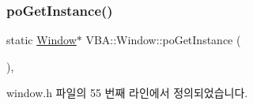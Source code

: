\mbox{\label{class_v_b_a_1_1_window_a8e084a0514c78b2c93013c3fb9e2e6e9}} 
\subsubsection{\texorpdfstring{po\+Get\+Instance()}{poGetInstance()}}
{\footnotesize\ttfamily static \mbox{\hyperlink{class_v_b_a_1_1_window}{Window}}$\ast$ V\+B\+A\+::\+Window\+::po\+Get\+Instance (\begin{DoxyParamCaption}{ }\end{DoxyParamCaption})\hspace{0.3cm}{\ttfamily [inline]}, {\ttfamily [static]}}



window.\+h 파일의 55 번째 라인에서 정의되었습니다.


